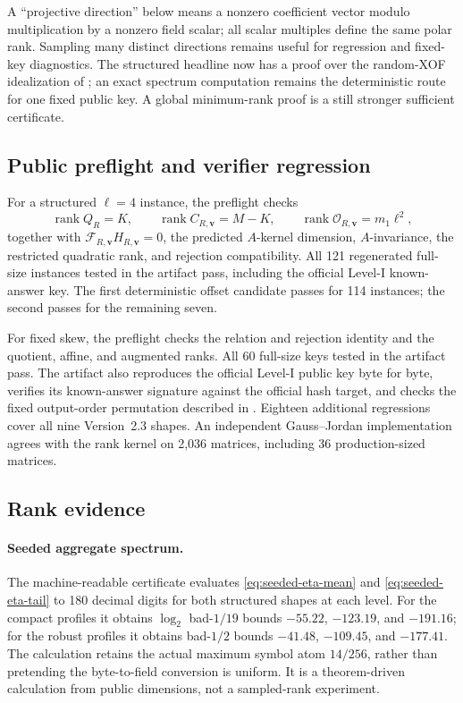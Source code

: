 \documentclass[11pt]{article}
\newcommand{\rank}{\operatorname{rank}}
\begin{document}
A ``projective direction'' below means a nonzero coefficient vector modulo
multiplication by a nonzero field scalar; all scalar multiples define the same
polar rank.  Sampling many distinct directions remains useful for regression
and fixed-key diagnostics.  The structured headline now has a proof over
the random-XOF idealization of ; an exact spectrum
computation remains the deterministic route for one fixed public key.  A
global minimum-rank proof is a still stronger sufficient certificate.

\subsection{Public preflight and verifier regression}

For a structured $\ell=4$ instance, the preflight checks
\[
 \rank Q_R=K,\qquad \rank C_{R,\mathbf v}=M-K,\qquad
 \rank\mathcal O_{R,\mathbf v}=m_1\ell^2,
\]
together with $\mathcal F_{R,\mathbf v}H_{R,\mathbf v}=0$, the predicted $A$-kernel
dimension, $A$-invariance, the restricted quadratic rank, and rejection
compatibility.  All 121 regenerated full-size instances tested in the artifact pass,
including the official Level-I known-answer key.  The first deterministic
offset candidate passes for 114 instances; the second passes for the remaining
seven.

For fixed skew, the preflight checks the relation and rejection identity and
the quotient, affine, and augmented ranks.  All 60 full-size keys tested in the artifact pass.  The artifact also reproduces the official Level-I public key byte for byte,
verifies its known-answer signature against the official hash target, and
checks the fixed output-order permutation described in
.  Eighteen additional regressions cover all nine
Version~2.3 shapes.  An independent Gauss--Jordan implementation agrees with
the rank kernel on 2,036 matrices, including 36 production-sized matrices.

\subsection{Rank evidence}

\paragraph{Seeded aggregate spectrum.}
The machine-readable certificate evaluates
\eqref{eq:seeded-eta-mean} and \eqref{eq:seeded-eta-tail} to 180 decimal digits for both
structured shapes at each level.  For the compact profiles it obtains
$\log_2$ bad-$1/19$ bounds $-55.22$, $-123.19$, and $-191.16$; for the robust
profiles it obtains bad-$1/2$ bounds $-41.48$, $-109.45$, and $-177.41$.
The calculation retains the actual maximum symbol atom $14/256$, rather than
pretending the byte-to-field conversion is uniform.  It is a theorem-driven
calculation from public dimensions, not a sampled-rank experiment.
\end{document}

